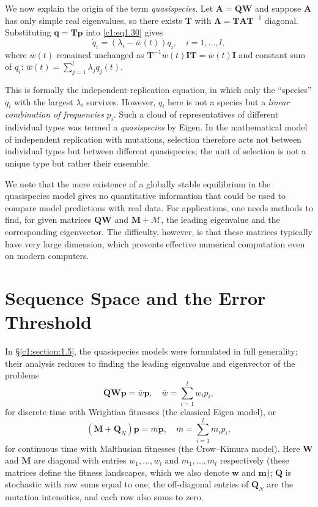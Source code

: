\documentclass[12pt]{report}
\newcommand{\bs}[1]{\bm{#1}}
\theoremstyle{definition}
\theoremstyle{remark}
\begin{document}
\medskip
We now explain the origin of the term \emph{quasispecies}.  Let $\bs{A}=\bs{QW}$ and
suppose $\bs{A}$ has only simple real eigenvalues, so there exists
$\bs{T}$ with $\bs{\Lambda}=\bs{TAT}^{-1}$ diagonal.
Substituting $\bs{q}=\bs{Tp}$ into \eqref{c1:eq1.30} gives
\[
  \dot{q}_i=(\lambda_i-\bar{w}(t))q_i,\quad i=1,\ldots,l, 
\]
where $\bar{w}(t)$ remained unchanged as $\bs T^{-1}\bar{w}(t)\bs I\bs T=\bar{w}(t)\bs I$ and constant sum of $q_i$: $\bar{w}(t)=\sum\limits_{j=1}^l\lambda_jq_j(t)$.

This is formally the independent-replication equation, in which only
the ``species'' $q_i$ with the largest $\lambda_i$ survives.
However, $q_i$ here is not a species but a \emph{linear combination
of frequencies} $p_i$.  Such a cloud of representatives of different
individual types was termed a \emph{quasispecies} by Eigen.
In the mathematical model of independent replication with mutations,
selection therefore acts not between individual types but between
different quasispecies; the unit of selection is not a unique type
but rather their ensemble.

We note that the mere existence of a globally stable equilibrium in
the quasispecies model gives no quantitative information that could
be used to compare model predictions with real data.  For applications,
one needs methods to find, for given matrices $\bs{QW}$ and
$\bs{M}+\bs{\mathcal{M}}$, the leading eigenvalue and the
corresponding eigenvector.  The difficulty, however, is that these
matrices typically have very large dimension, which prevents effective
numerical computation even on modern computers.

\section{Sequence Space and the Error Threshold}
\label{c1:section:1.6}

In \S\ref{c1:section:1.5}, the quasispecies models were formulated in
full generality; their analysis reduces to finding the leading
eigenvalue and eigenvector of the problems
\begin{equation}
  \bs{QWp}=\bar{w}\bs{p},\quad \bar{w}=\sum_{i=1}^{l}w_ip_i,
  \label{c1:eq1.32}
\end{equation}
for discrete time with Wrightian fitnesses (the classical Eigen model),
or
\begin{equation}
  (\bs{M}+\bs{Q}_N)\bs{p}=\bar{m}\bs{p},\quad
  \bar{m}=\sum_{i=1}^{l}m_ip_i,
  \label{c1:eq1.33}
\end{equation}
for continuous time with Malthusian fitnesses (the Crow--Kimura model).
Here $\bs{W}$ and $\bs{M}$ are diagonal with entries
$w_1,\ldots,w_l$ and $m_1,\ldots,m_l$ respectively (these matrices
define the fitness landscapes, which we also denote $\bs{w}$ and
$\bs{m}$); $\bs{Q}$ is stochastic with row sums equal to one; the
off-diagonal entries of $\bs{Q}_N$ are the mutation intensities,
and each row also sums to zero.
\end{document}
